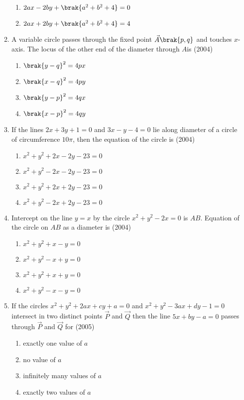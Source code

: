 \begin{enumerate}
\begin{enumerate}
\item $2ax-2by+\brak{a^2+b^2+4}=0$
\item $2ax+2by+\brak{a^2+b^2+4}=4$
\end{enumerate}
\item A variable circle passes through the fixed point $\vec{A}\brak{p,q}$ and touches $x$-axis. The locus of the other end of the diameter through $A$is
\hfill{(2004)}
\begin{multicols}{2}
\begin{enumerate}
\item $\brak{y-q}^2=4px$
\item $\brak{x-q}^2=4py$ 
\item $\brak{y-p}^2=4qx$
\item $\brak{x-p}^2=4qy$
\end{enumerate}
\end{multicols}
\item If the lines $2x+3y+1=0$ and $3x-y-4=0$ lie along diameter of a circle of circumference $10\pi$, then the equation of the circle is 
\hfill{(2004)}
\begin{enumerate}
\item $x^2+y^2+2x-2y-23=0$
\item $x^2+y^2-2x-2y-23=0$
\item $x^2+y^2+2x+2y-23=0$
\item $x^2+y^2-2x+2y-23=0$
\end{enumerate}
\item Intercept on the line $y=x$ by the circle $x^2+y^2-2x=0$ is $AB$. Equation of the circle on $AB$ as a diameter is 
\hfill{(2004)}
\begin{enumerate}
\item $x^2+y^2+x-y=0$
\item $x^2+y^2-x+y=0$
\item $x^2+y^2+x+y=0$
\item $x^2+y^2-x-y=0$
\end{enumerate}
\item If the circles $x^2+y^2+2ax+cy+a=0$ and $x^2+y^2-3ax+dy-1=0$ intersect in two distinct points $\vec{P}$ and $\vec{Q}$ then the line $5x+by-a=0$ passes through $\vec{P}$ and $\vec{Q}$ for
\hfill{(2005)}
\begin{enumerate}
\item exactly one value of $a$
\item no value of $a$
\item infinitely many values of $a$
\item exactly two values of $a$

\end{enumerate}
\end{enumerate}
